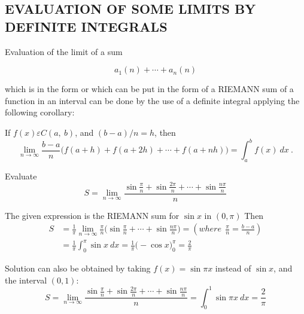 \documentclass[11pt]{amsbook}
\begin{document}

\subsection{EVALUATION OF SOME LIMITS BY DEFINITE INTEGRALS}
Evaluation of the limit of a sum 

\[
    a_{1}(n) +\cdots + a_{n}(n)
\]

\noindent which is in the form or which can be put in the form of a RIEMANN sum of a function in an interval can be done by the use of a definite integral applying the following corollary:

\begin{cor}
If $f(x) \varepsilon C(a,\ b)$, and $(b-a)/n = h$, then 
\[ 
    \lim _{ n\rightarrow \infty}
        \frac{b-a}{n} 
        \Big( f(a+h) + f(a+2h) + \cdots + f(a+nh) \Big) 
        = \int ^{b}_{a} f(x) \ dx
\ .\]
\end{cor}

\begin{exmp}
    Evaluate
    \[ 
        S =  \lim _{ n \rightarrow \infty }
            \frac {
                \sin \frac{\pi}{n} + 
                \sin\frac{2\pi}{n} +
                \cdots +
                \sin\frac{n\pi}{n}
            }{n} 
    \]
    \begin{hSolution}
        The given expression is the RIEMANN sum for $ \sin x $ in $ (0, \pi) $ Then
            \begin{align*}
                S & = \frac{1}{\pi}
                    \lim _{n \rightarrow \infty}
                        \frac{\pi}{n} 
                            \Big( 
                                \sin \frac{\pi}{n} + 
                                \cdots + 
                                \sin \frac{n\pi}{n}
                            \Big) 
                = (where \ \ \frac{\pi}{n} = \frac{b-a}{n}) \\
                & = \frac{1}{\pi} 
                    \int ^{\pi}_{0}
                        \sin x \ dx 
                = \frac{1}{\pi} 
                        \Big(
                            -\cos x 
                        \Big) ^{\pi}_{0} 
                = \frac{2}{\pi} 
            \end{align*}
       \par Solution can also be obtained by taking $ f(x) = \sin \pi x $ instead of $ \sin x $, and the interval $ (0, 1) $:
            \[ 
                S =  \lim _{n \rightarrow \infty}
                        \frac{ 
                            \sin \frac{\pi}{n} + 
                            \sin\frac{2\pi}{n} + 
                            \cdots + 
                            \sin\frac{n\pi}{n}
                        }{n} 
                = \int ^{1}_{0} \sin \pi x \ dx 
                = \frac{2}{\pi} 
            \]
    \end{hSolution}
\end{exmp}
\end{document}
